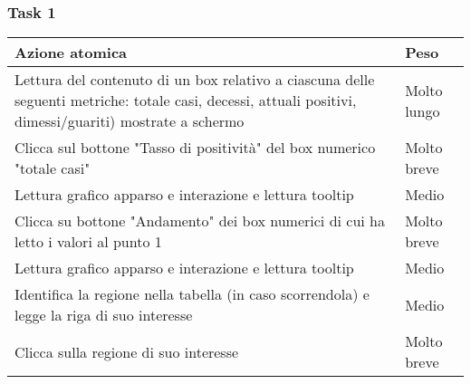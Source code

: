 \subsubsection{Task 1}
\label{sss:iaa-task-1}
{
\renewcommand{\arraystretch}{2}
\begin{longtable}[h]{| p{14cm} | p{2.5cm} |}
    \hline
    \textbf{Azione atomica} & \textbf{Peso} \\
    \hline
    \endhead
    Lettura del contenuto di un box relativo a ciascuna delle seguenti metriche: totale casi, decessi, attuali positivi, dimessi/guariti) mostrate a schermo & Molto lungo \\
    \hline
    Clicca sul bottone "Tasso di positività" del box numerico "totale casi" & Molto breve  \\
    \hline
    Lettura grafico apparso e interazione e lettura tooltip & Medio \\
    \hline
    Clicca su bottone "Andamento" dei box numerici di cui ha letto i valori al punto 1 & Molto breve \\
    \hline
    Lettura grafico apparso e interazione e lettura tooltip & Medio \\
    \hline
    Identifica la regione nella tabella (in caso scorrendola) e legge la riga di suo interesse & Medio \\
    \hline
    Clicca sulla regione di suo interesse & Molto breve \\
    \hline
\end{longtable}
}